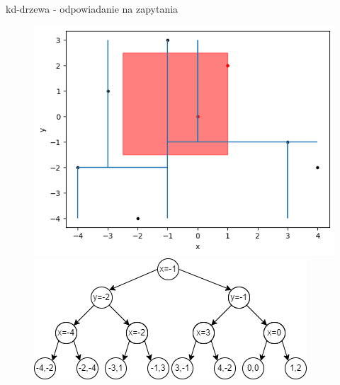 \documentclass[aspectratio=169,dvipsnames]{beamer}
\begin{document}
\begin{frame}{kd-drzewa - odpowiadanie na zapytania}
    \begin{figure}[H]
        \centering
          \begin{minipage}{0.5\textwidth}
            \centering
            \includegraphics[width=\linewidth]{images/plots/9.png}
          \end{minipage}%
          \begin{minipage}{0.5\textwidth}
            \centering
            \includegraphics[width=\linewidth]{images/trees/12.drawio.png}
          \end{minipage}
    \end{figure}
\end{frame}
\end{document}
